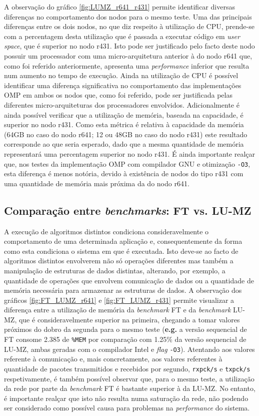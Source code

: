 \documentclass{article}
\begin{document}
\quad A observação do gráfico \ref{fig:LUMZ_r641_r431} permite identificar diversas diferenças no comportamento dos nodos para o mesmo teste. Uma das 
principais diferenças entre os dois nodos, no que diz respeito à utilização de CPU, prende-se com a percentagem desta utilização que é passada a executar 
código em \textit{user space}, que é superior no nodo r431. Isto pode ser justificado pelo facto deste nodo possuir um processador com uma micro-arquitetura
anterior à do nodo r641 que, como foi referido anteriormente, apresenta uma \textit{performance} inferior que resulta num aumento no tempo de execução. 
Ainda na utilização de CPU é possível identificar uma diferença significativa no comportamento das implementações OMP em ambos os nodos que, como 
foi referido, pode ser justificada pelas diferentes micro-arquiteturas dos processadores envolvidos. Adicionalmente é ainda possível verificar que a utilização de memória, baseada na capacidade, é superior no nodo r431. Como esta métrica é relativa à capacidade da memória (64GB no caso do nodo r641; 12 ou 48GB 
no caso do nodo r431) este resultado corresponde ao que seria esperado, dado que a mesma quantidade de memória representará uma percentagem superior 
no nodo r431. É ainda importante realçar que, nos testes da implementação OMP com compilador GNU e otimização \texttt{-O3}, esta diferença é menos notória, devido à 
existência de nodos do tipo r431 com uma quantidade de memória mais próxima da do nodo r641.


\subsection{Comparação entre \textit{benchmarks}: FT vs. LU-MZ}

\quad A execução de algoritmos distintos condiciona consideravelmente o comportamento de uma determinada aplicação e, consequentemente da forma 
como esta condiciona o sistema em que é executada. Isto deve-se ao facto de algoritmos distintos envolverem não só operações diferentes mas 
também a manipulação de estruturas de dados distintas, alterando, por exemplo, a quantidade de operações que envolvem comunicação de dados ou 
a quantidade de memória necessária para armazenar as estruturas de dados. A observação dos gráficos \ref{fig:FT_LUMZ_r641} e \ref{fig:FT_LUMZ_r431} 
permite visualizar a diferença entre a utilização de memória da \textit{benchmark} FT e da \textit{benchmark} LU-MZ, que é consideravelmente superior 
na primeira, chegando a tomar valores próximos do dobro da segunda para o mesmo teste (\textbf{e.g.} a versão sequencial de FT consome 2.385 de 
\texttt{\%MEM} por comparação com 1.25\% da versão sequencial de LU-MZ, ambas geradas com o compilador Intel e \textit{flag} \texttt{-O3}).
Atentando aos valores referente à comunicação e, mais concretamente, aos valores referentes à quantidade de pacotes transmitidos e recebidos por segundo, 
\texttt{rxpck/s} e  \texttt{txpck/s} respetivamente, é também possível observar que, para o mesmo teste, a utilização da rede por parte da 
\textit{benchmark} FT é bastante superior à da LU-MZ. No entanto, é importante realçar que isto não resulta numa saturação da rede, não 
podendo ser considerado como possível causa para problemas na \textit{performance} do sistema.
\end{document}
